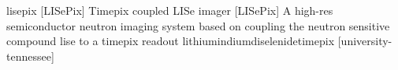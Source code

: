 \newglsXequipment%
{lisepix}%
[LISePix]%
{Timepix coupled LISe imager}%
[LISePix]%
{A \gls{high-res} semiconductor neutron imaging system based on coupling the neutron sensitive compound \gls{lise} to a \gls{timepix} readout}%
{lithiumindiumdiselenidetimepix}%
[university-tennessee]%